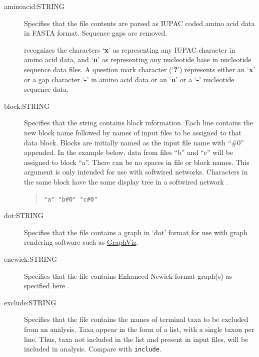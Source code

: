 	\begin{description}
	
		\item [aminoacid:STRING] Specifies that the file contents are parsed as IUPAC 
		coded amino acid data in FASTA \citep{PearsonandLipman1988} format. Sequence 
		gaps are removed.

		\begin{tcolorbox}[enhanced,fit to height=3cm,
  		colback=JungleGreen!40!black!2!white,colframe=JungleGreen!70!black,title=Note,
  		drop fuzzy shadow]
  		\phyg recognizes the characters `\textbf{x}' as representing any IUPAC character in 
		amino acid data, and `\textbf{n}' as representing any nucleotide base in nucleotide 
		sequence data files. A question mark character (`\textbf{?}') represents either an 
		`\textbf{x}' or a gap character `\textbf{-}' in amino acid data or an `\textbf{n}' or a 
		`\textbf{-}' nucleotide sequence data.
		\end{tcolorbox}

		\item [block:STRING] Specifies that the string contains block information. Each line 
		contains the new block name followed by names of input files to be assigned to that 
		data block. Blocks are initially named as the input file name with ``\#0'' appended. 
		In the example below, data from files ``b'' and ``c'' will be assigned to block ``a''. 
		There can be no spaces in file or block names. This argument is only intended for 
		use with softwired networks. Characters in the same block have the same display 
		tree in a softwired network \citep{WheelerandWashburn2023}.
			
			\begin{quote}
			\texttt{"a" "b\#0" "c\#0"}
			\end{quote}
	
		\item [dot:STRING] Specifies that the file contains a graph in `dot' format for use with 
		graph rendering software such as \href{https://en.wikipedia.org/wiki/Graphviz}{GraphViz}.
			
		\item [enewick:STRING] Specifies that the file contains Enhanced Newick format graph(s) 
		as specified here \citep{Cardonaetal2008}. 
			
		\item [exclude:STRING] Specifies that the file contains the names of terminal taxa to be 
		excluded from an analysis. Taxa appear in the form of a list, with a single taxon per 
		line. Thus, taxa not included in the list and present in input files, will be included in 
		analysis. Compare with \texttt{include}.
			

\end{description}
